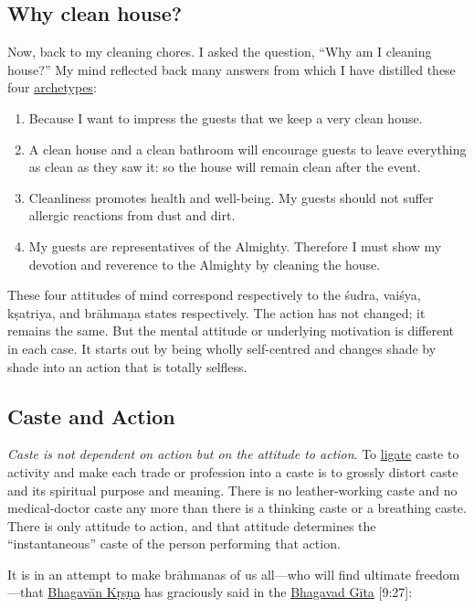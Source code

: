 \documentclass[
  a4paper,
]{article}
\begin{document}
\subsection{Why clean house?}\label{why-clean-house}

Now, back to my cleaning chores. I asked the question, ``Why am I
cleaning house?'' My mind reflected back many answers from which I have
distilled these four
\href{https://www.thefreedictionary.com/archetype}{archetypes}:

\begin{enumerate}
\item
  Because I want to impress the guests that we keep a very clean house.
\item
  A clean house and a clean bathroom will encourage guests to leave
  everything as clean as they saw it: so the house will remain clean
  after the event.
\item
  Cleanliness promotes health and well-being. My guests should not
  suffer allergic reactions from dust and dirt.
\item
  My guests are representatives of the Almighty. Therefore I must show
  my devotion and reverence to the Almighty by cleaning the house.
\end{enumerate}

These four attitudes of mind correspond respectively to the śudra,
vaiśya, kṣatriya, and brāhmaṇa states respectively. The action has not
changed; it remains the same. But the mental attitude or underlying
motivation is different in each case. It starts out by being wholly
self-centred and changes shade by shade into an action that is totally
selfless.

\subsection{Caste and Action}\label{caste-and-action}

\emph{Caste is not dependent on action but on the attitude to action}.
To \href{https://www.vocabulary.com/dictionary/ligate}{ligate} caste to
activity and make each trade or profession into a caste is to grossly
distort caste and its spiritual purpose and meaning. There is no
leather-working caste and no medical-doctor caste any more than there is
a thinking caste or a breathing caste. There is only attitude to action,
and that attitude determines the ``instantaneous'' caste of the person
performing that action.

It is in an attempt to make brāhmanas of us all---who will find ultimate
freedom---that
\href{https://yssofindia.org/about/bhagavan-krishna}{Bhagavān Kṛṣṇa} has
graciously said in the
\href{https://en.wikipedia.org/wiki/Bhagavad_Gita}{Bhagavad Gīta}
{[}9:27{]}:
\end{document}
